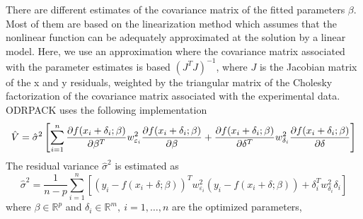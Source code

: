 There are different estimates of the covariance matrix of the fitted parameters $\beta$.
Most of them are based on the linearization method which assumes that the nonlinear function can be adequately approximated at the solution by a linear model. Here, 
we use an approximation where the covariance matrix associated with the parameter estimates is based $\left(J^T J \right)^{-1}$, where $J$ is the Jacobian matrix of
the x and y residuals, weighted by the triangular matrix of the Cholesky factorization of the covariance matrix associated with the experimental data.
ODRPACK uses the following implementation \cite{odrcov}
\begin{equation}
 \hat V = \hat \sigma^2 \left[ \sum_{i=1}^n \frac{\partial f(x_i+\delta_i; \beta)}{\partial \beta ^T} w^2_{\varepsilon_i} \frac{\partial f(x_i+\delta_i; \beta)}{\partial \beta} +  
 \frac{\partial f(x_i+\delta_i; \beta)}{\partial \delta ^T} w^2_{\delta_i} \frac{\partial f(x_i+\delta_i; \beta)}{\partial \delta}\right]
\end{equation}
The residual variance $\hat \sigma^2$ is estimated as
\begin{equation}
 \hat \sigma^2 = \frac1{n-p} \sum_{i=1}^n \left[ \left(y_i - f(x_i+\delta; \beta)\right)^T w^2_{\varepsilon_i} \left(y_i - f(x_i+\delta; \beta)\right)  + 
 \delta_i^T w^2_{\delta_i} \delta_i \right]
 \end{equation}
 where $\beta \in \mathbb{R}^p$ and $\delta_i \in \mathbb{R}^m,\ i=1,\dots, n$ are the optimized parameters, 


